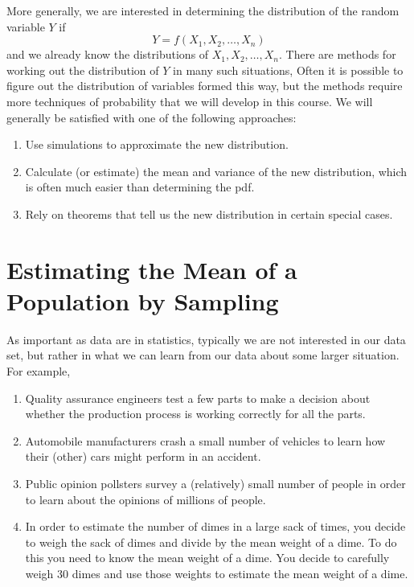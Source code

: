 \documentclass[twoside]{book}\usepackage[]{graphicx}\usepackage[]{xcolor}
\newcounter{example}[section]
\begin{document}
More generally, we are interested in determining the distribution of the random 
variable $Y$ if 
\[Y = f(X_1, X_2, \dots, X_n)\]
and we already know the distributions of $X_1, X_2, \dots, X_n$.
There are methods for working out the distribution of $Y$ in many such situations, 
Often it is possible to figure out the distribution of variables formed this way,
but the methods require more techniques of probability that we will develop in this 
course.  We will generally be satisfied with one of the following approaches:
\begin{enumerate}
	\item
		Use simulations to approximate the new distribution.
	\item
		Calculate (or estimate) the mean and variance of the new distribution,
		which is often much easier than determining the pdf.
	\item
		Rely on theorems that tell us the new distribution in certain special
		cases.
\end{enumerate}

\section{Estimating the Mean of a Population by Sampling}

As important as data are in statistics, typically we are not interested in our 
data set, but rather in what we can learn from our data about some larger situation.
For example,
\begin{enumerate}
  \item
		Quality assurance engineers test a few parts to make a decision about 
		whether the production process is working correctly for all the parts.  
	\item 
	Automobile manufacturers crash a small number of vehicles to learn how
	their (other) cars might perform in an accident.  
\item 
	Public opinion pollsters survey a (relatively) small number of people in order to learn
about the opinions of millions of people.
\item
	In order to estimate the number of dimes in a large sack of times, you decide to
	weigh the sack of dimes and divide by the mean weight of a dime.  To do this you
	need to know the mean weight of a dime.  You decide to carefully weigh 30 dimes
	and use those weights to estimate the mean weight of a dime.
\end{enumerate}
\end{document}
